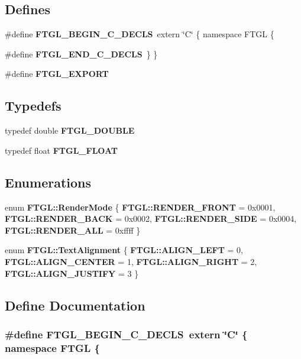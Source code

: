 \subsection*{Defines}
\begin{CompactItemize}
\item 
\#define {\bf FTGL\_\-BEGIN\_\-C\_\-DECLS}~extern \char`\"{}C\char`\"{} \{ namespace FTGL \{
\item 
\#define {\bf FTGL\_\-END\_\-C\_\-DECLS}~\} \}
\item 
\#define {\bf FTGL\_\-EXPORT}
\end{CompactItemize}
\subsection*{Typedefs}
\begin{CompactItemize}
\item 
typedef double {\bf FTGL\_\-DOUBLE}
\item 
typedef float {\bf FTGL\_\-FLOAT}
\end{CompactItemize}
\subsection*{Enumerations}
\begin{CompactItemize}
\item 
enum {\bf FTGL::RenderMode} \{ {\bf FTGL::RENDER\_\-FRONT} =  0x0001, 
{\bf FTGL::RENDER\_\-BACK} =  0x0002, 
{\bf FTGL::RENDER\_\-SIDE} =  0x0004, 
{\bf FTGL::RENDER\_\-ALL} =  0xffff
 \}
\item 
enum {\bf FTGL::TextAlignment} \{ {\bf FTGL::ALIGN\_\-LEFT} =  0, 
{\bf FTGL::ALIGN\_\-CENTER} =  1, 
{\bf FTGL::ALIGN\_\-RIGHT} =  2, 
{\bf FTGL::ALIGN\_\-JUSTIFY} =  3
 \}
\end{CompactItemize}


\subsection{Define Documentation}
\subsubsection[{FTGL\_\-BEGIN\_\-C\_\-DECLS}]{\setlength{\rightskip}{0pt plus 5cm}\#define FTGL\_\-BEGIN\_\-C\_\-DECLS~extern \char`\"{}C\char`\"{} \{ namespace FTGL \{}\label{ftgl_8h_1543f6485dcd3ef6db0a10396071a6f6}




